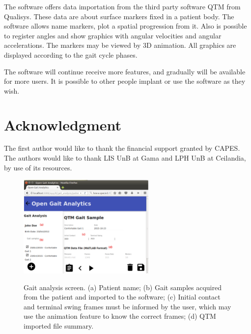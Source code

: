 \documentclass[journal]{IEEEtran}
\begin{document}
The software offers data importation from the third party software QTM from Qualisys.
These data are about surface markers fixed in a patient body.
The software allows name markers, plot a spatial progression from it.
Also is possible to register angles and show graphics with angular velocities and angular accelerations.
The markers may be viewed by 3D animation.
All graphics are displayed according to the gait cycle phases.

The software will continue receive more features, and gradually will be available for more users.
It is possible to other people implant or use the software as they wish.

\section*{Acknowledgment}

The first author would like to thank the financial support granted by CAPES.
The authors would like to thank LIS UnB at Gama and LPH UnB at Ceilandia,
by use of its resources.

\begin{figure}[tb]
	\centering
	{\includegraphics[width=0.6\textwidth]{./qtm_data.eps}}
	\caption{Gait analysis screen. 
		(a) Patient name;
		(b) Gait samples acquired from the patient and imported to the software;
		(c) Initial contact and terminal swing frames must be informed by the user,
		which may use the animation feature to know the correct frames;
		(d) QTM imported file summary.
	}
	\label{qtm_data}
\end{figure}
\end{document}
